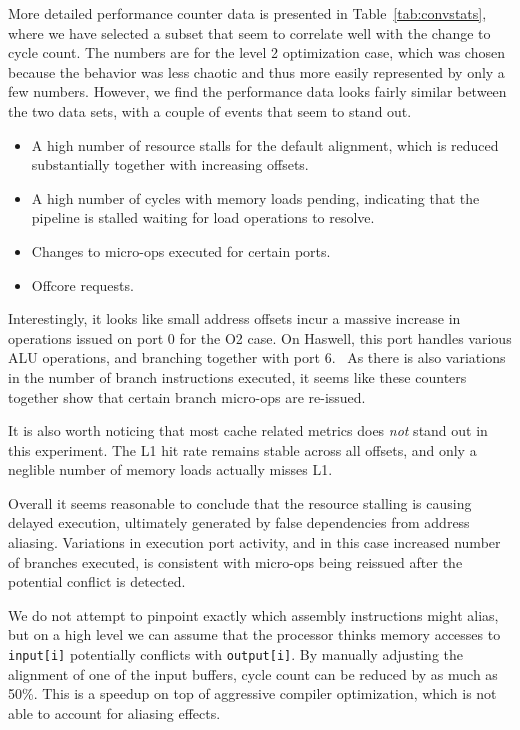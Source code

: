 \documentclass[a4paper,10pt,twocolumn,twoside]{article}
\begin{document}
{More detailed performance counter data is presented in Table~\ref{tab:convstats}, where we have selected a subset that seem to correlate well with the change to cycle count.
The numbers are for the level 2 optimization case, which was chosen because the behavior was less chaotic and thus more easily represented by only a few numbers.
However, we find the performance data looks fairly similar between the two data sets, with a couple of events that seem to stand out.
\begin{itemize}
    \item A high number of resource stalls for the default alignment, which is reduced substantially together with increasing offsets. 
    \item A high number of cycles with memory loads pending, indicating that the pipeline is stalled waiting for load operations to resolve.
    \item Changes to micro-ops executed for certain ports.
    \item Offcore requests. %
\end{itemize} 
Interestingly, it looks like small address offsets incur a massive increase in operations issued on port 0 for the O2 case. 
On Haswell, this port handles various ALU operations, and branching together with port 6.~\cite[Figure 2.1]{OptimizationManual}
As there is also variations in the number of branch instructions executed, it seems like these counters together show that certain branch micro-ops are re-issued.

It is also worth noticing that most cache related metrics does \emph{not} stand out in this experiment.
The L1 hit rate remains stable across all offsets, and only a neglible number of memory loads actually misses L1.

Overall it seems reasonable to conclude that the resource stalling is causing delayed execution, ultimately generated by false dependencies from address aliasing.
Variations in execution port activity, and in this case increased number of branches executed, is consistent with micro-ops being reissued after the potential conflict is detected.

We do not attempt to pinpoint exactly which assembly instructions might alias, but on a high level we can assume that the processor thinks memory accesses to \texttt{input[i]} potentially conflicts with \texttt{output[i]}.
By manually adjusting the alignment of one of the input buffers, cycle count can be reduced by as much as 50\%.
This is a speedup on top of aggressive compiler optimization, which is not able to account for aliasing effects.

}
\end{document}
